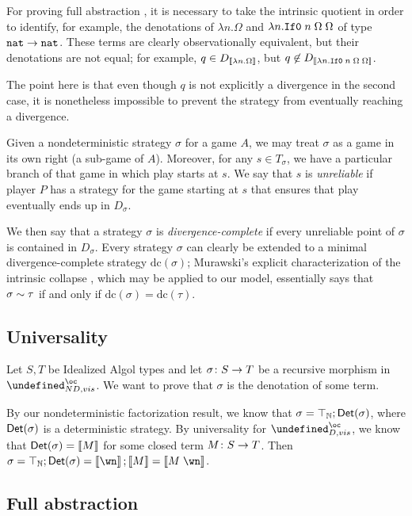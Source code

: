 \documentclass[sigplan,9pt,review]{acmart}\settopmatter{printfolios=true,printccs=false,printacmref=false}
\let\G\undefined
\begin{document}
For proving full abstraction , it is necessary to take the intrinsic quotient in order to identify, for example, the denotations of $\lambda n.\Omega$ and $\lambda n.{\mathtt{If0}\;} n\;\Omega\;\Omega$ of type ${\mathtt{nat}}\to{\mathtt{nat}}$.  
These terms are clearly observationally equivalent, but their denotations are not equal; for example, $q\in D_{\left\llbracket\lambda n.\Omega\right\rrbracket}$, but $q\not\in D_{\left\llbracket\lambda n.{\mathtt{If0}\;} n\;\Omega\;\Omega\right\rrbracket}$.

The point here is that even though $q$ is not explicitly a divergence in the second case, it is nonetheless impossible to prevent the strategy from eventually reaching a divergence.  

Given a nondeterministic strategy $\sigma$ for a game $A$, we may treat $\sigma$ as a game in its own right (a sub-game of $A$).  
Moreover, for any $s\in T_\sigma$, we have a particular branch of that game in which play starts at $s$.  
We say that $s$ is \emph{unreliable} if player $P$ has a strategy for the game starting at $s$ that ensures that play eventually ends up in $D_\sigma$.  

We then say that a strategy $\sigma$ is \emph{divergence-complete} if every unreliable point of $\sigma$ is contained in $D_\sigma$.  
Every strategy $\sigma$ can clearly be extended to a minimal divergence-complete strategy $\text{dc}(\sigma)$; Murawski's explicit characterization of the intrinsic collapse \cite{MurawskiIntrinsic}, which may be applied to our model, essentially says that $\sigma\sim\tau$ if and only if $\text{dc}(\sigma)=\text{dc}(\tau)$.

\subsection{Universality}

Let $S,T$ be Idealized Algol types and let $\sigma\colon S\to T$ be a recursive morphism in $\G_{ND,vis}^\oc$.  
We want to prove that $\sigma$ is the denotation of some term.  

By our nondeterministic factorization result, we know that $\sigma=\top_{\mathbb{N}};\mathsf{Det}(\sigma)$, where $\mathsf{Det}(\sigma)$ is a deterministic strategy.  
By universality for $\G_{D,vis}^\oc$, we know that $\mathsf{Det}(\sigma)=\left\llbracket M\right\rrbracket$ for some closed term $M\colon S \to T$.  
Then $\sigma=\top_\bN;\Det(\sigma)=\deno{\wn};\deno M = \deno{M\;\wn}$.

\subsection{Full abstraction}
\end{document}
